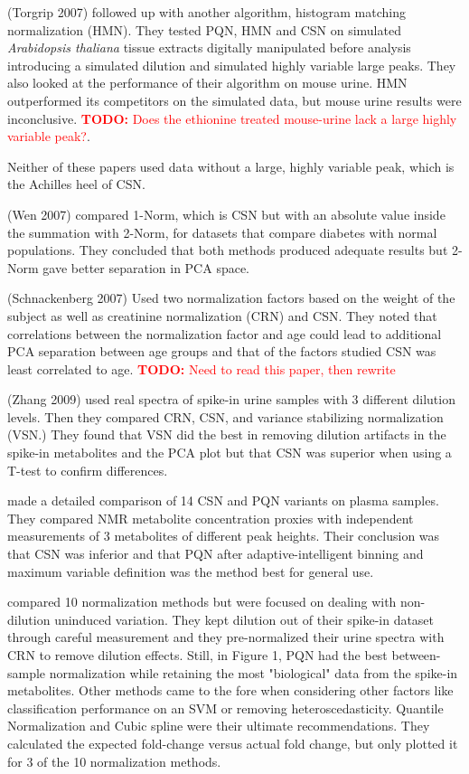 \documentclass[english]{article}
\newcommand{\todo}[1]{\textcolor{red}{\textbf{TODO:} #1}}
\begin{document}
(Torgrip 2007) followed up with another algorithm, histogram matching normalization (HMN). They tested PQN, HMN and CSN on simulated \textit{Arabidopsis thaliana} tissue extracts digitally manipulated before analysis introducing a simulated dilution and simulated highly variable large peaks. They also looked at the performance of their algorithm on mouse urine. HMN outperformed its competitors on the simulated data, but mouse urine results were inconclusive. \todo{Does the ethionine treated mouse-urine lack a large highly variable peak?}.

Neither of these papers used data without a large, highly variable peak, which is the Achilles heel of CSN.

(Wen 2007) compared 1-Norm, which is CSN but with an absolute value inside the summation with 2-Norm, for datasets that compare diabetes with normal populations. They concluded that both methods produced adequate results but 2-Norm gave better separation in PCA space.

(Schnackenberg 2007) Used two normalization factors based on the weight of the subject as well as creatinine normalization (CRN) and CSN. They noted that correlations between the normalization factor and age could lead to additional PCA separation between age groups and that of the factors studied CSN was least correlated to age. \todo{Need to read this paper, then rewrite}

(Zhang 2009) used real spectra of spike-in urine samples with 3 different dilution levels. Then they compared CRN, CSN, and variance stabilizing normalization (VSN.) They found that VSN did the best in removing dilution artifacts in the spike-in metabolites and the PCA plot but that CSN was superior when using a T-test to confirm differences.

\cite{DeMeyer2010a} made a detailed comparison of 14 CSN and PQN variants on plasma samples. They compared NMR metabolite concentration proxies with independent measurements of 3 metabolites of different peak heights. Their conclusion was that CSN was inferior and that PQN after adaptive-intelligent binning and maximum variable definition was the method best for general use.

\cite{Kohl2012} compared 10 normalization methods but were focused on dealing with non-dilution uninduced variation. They kept dilution out of their spike-in dataset through careful measurement and they pre-normalized their urine spectra with CRN to remove dilution effects. Still, in Figure 1, PQN had the best between-sample normalization while retaining the most "biological" data from the spike-in metabolites. Other methods came to the fore when considering other factors like classification performance on an SVM or removing heteroscedasticity. Quantile Normalization and Cubic spline were their ultimate recommendations. They calculated the expected fold-change versus actual fold change, but only plotted it for 3 of the 10 normalization methods.
\end{document}
